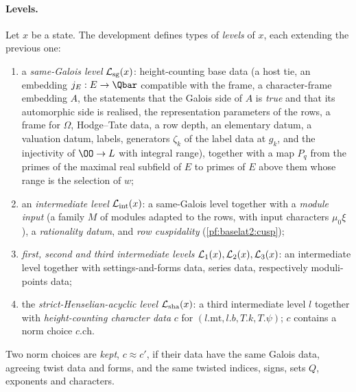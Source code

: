\paragraph{Levels.} Let $x$ be a state. The development defines types of \emph{levels} of $x$, each
extending the previous one:
\begin{enumerate}[label=(L\arabic*)]
\item a \emph{same-Galois level} $\mathcal{L}_{\mathrm{sg}}(x)$: height-counting base data
  (a host tie, an embedding $j_E:E\to\Qbar$ compatible with the frame, a character-frame embedding $A$,
  the statements that the Galois side of $A$ is \emph{true} and that its automorphic side is realised,
  the representation parameters of the rows, a frame for $\Omega$, Hodge--Tate data, a row depth, an
  elementary datum, a valuation datum, labels, generators $\zeta_k$ of the label data at $g_k$, and the
  injectivity of $\OO\to L$ with integral range), together with a map $P_q$ from the primes of the
  maximal real subfield of $E$ to primes of $E$ above them whose range is the selection of $w$;
\item an \emph{intermediate level} $\mathcal{L}_{\mathrm{int}}(x)$: a same-Galois level together with a \emph{module
  input} (a family $M$ of modules adapted to the rows, with input characters $\mu_0\xi$), a
  \emph{rationality datum}, and \emph{row cuspidality} (\cref{pf:baselat2:cusp});
\item \emph{first, second and third intermediate levels} $\mathcal{L}_{\mathrm{1}}(x),\mathcal{L}_{\mathrm{2}}(x),\mathcal{L}_{\mathrm{3}}(x)$:
  an intermediate level together with settings-and-forms data, series data, respectively moduli-points
  data;
\item the \emph{strict-Henselian-acyclic level} $\mathcal{L}_{\mathrm{sha}}(x)$: a third intermediate level $l$
  together with \emph{height-counting character data} $c$ for $(l.\mathrm{mt},l.b,T.k,T.\psi)$; $c$ contains a
  norm choice $c.\mathrm{ch}$.
\end{enumerate}
Two norm choices are \emph{kept}, $c\approx c'$, if their data have the same Galois data, agreeing
twist data and forms, and the same twisted indices, signs, sets $Q$, exponents and characters.

